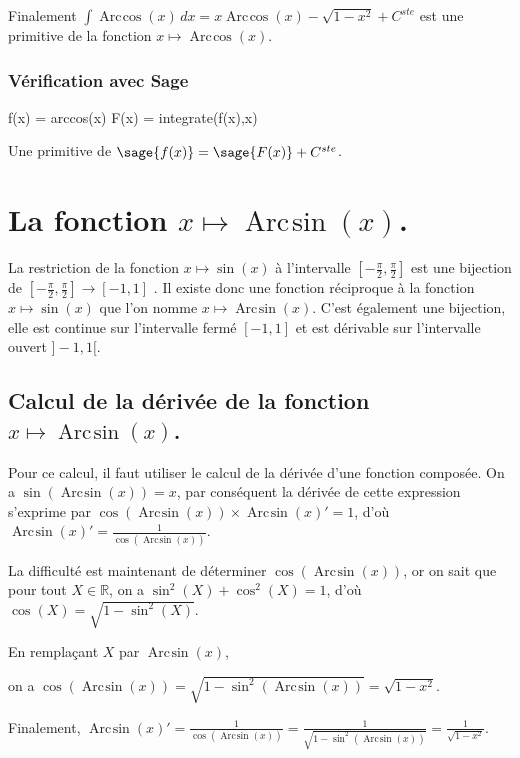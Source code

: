 \documentclass[a4paper,12pt]{report}
\def\eclaire{\mathbb}
\def\R{\ensuremath{\eclaire R}}
\renewcommand{\arcsin}{\mathop{\mathrm{Arc\mspace{2mu}sin}}}
\renewcommand{\arccos}{\mathop{\mathrm{Arc\mspace{2mu}cos}}}
\begin{document}
Finalement $\int \arccos(x) \, dx = x  \arccos(x) - \sqrt{1- x^2} + C^{ste} $ est une primitive de la fonction $x \mapsto \arccos(x) $.

\subsubsection*{Vérification avec Sage}

\begin{sageblock}
    f(x) = arccos(x)
    F(x) = integrate(f(x),x)
\end{sageblock}

Une primitive de $\sage{f(x)} = \sage{F(x)} + C^{ste}$.


\section{La fonction  $x \mapsto \arcsin(x) $.}

La restriction de la fonction $x \mapsto \sin(x) $ à l'intervalle $\left[-\frac{\pi}{2},\frac{\pi}{2}\right]$ est une bijection de $\left[-\frac{\pi}{2},\frac{\pi}{2}\right] \rightarrow [-1,1]$ . Il existe donc une fonction réciproque à la fonction $x \mapsto \sin(x) $ que l'on nomme $x \mapsto \arcsin(x) $. C'est également une bijection, elle est continue sur l'intervalle fermé  $ [-1,1]$ et est dérivable sur l'intervalle ouvert $]-1,1[$.

\subsection{Calcul de la dérivée de la fonction $x \mapsto \arcsin(x) $.}


Pour ce calcul, il faut utiliser le calcul de la dérivée d'une fonction composée. On a $\sin(\arcsin(x))=x$, par conséquent la dérivée de cette expression s'exprime par $ \cos(\arcsin(x)) \times \arcsin(x) ' = 1$, d'où $\arcsin(x) ' = \frac{1}{\cos(\arcsin(x))} $.

La difficulté est maintenant de déterminer $\cos(\arcsin(x))$, or on sait que pour tout $X \in \R$, on a $\sin^2(X) + \cos^2(X) = 1$, d'où $\cos(X) = \sqrt{1-\sin^2(X)}$.

En remplaçant $X$ par $\arcsin(x)$, 

on a $\cos(\arcsin(x)) = \sqrt{1-\sin^2(\arcsin(x))} = \sqrt{1- x^2}$.

Finalement, $\arcsin(x) ' = \frac{1}{\cos(\arcsin(x))}  = \frac{1}{\sqrt{1-\sin^2(\arcsin(x))}} =  \frac{1}{\sqrt{1- x^2}} $.
\end{document}
